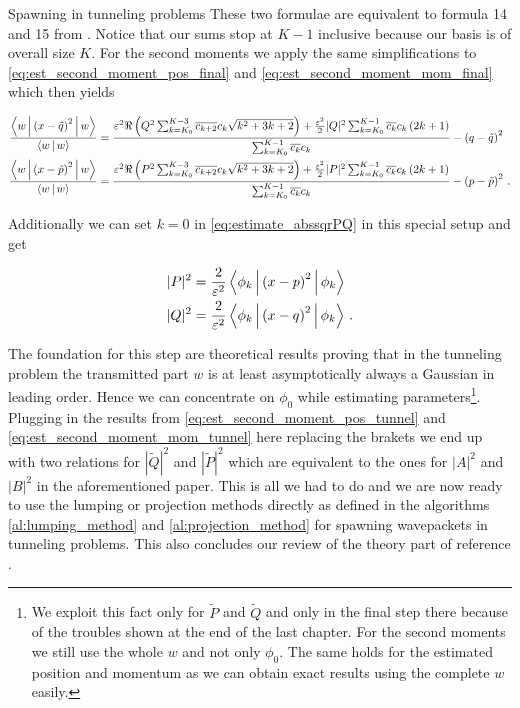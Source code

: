 \begin{chapter}{Spawning in tunneling problems}
These two formulae are equivalent to formula 14 and 15 from \cite{GHJ_tunneling_spawning}.
Notice that our sums stop at $K-1$ inclusive because our basis is of overall size $K$.
For the second moments we apply the same simplifications to \eqref{eq:est_second_moment_pos_final}
and \eqref{eq:est_second_moment_mom_final} which then yields

\begin{align} \label{eq:est_second_moment_pos_tunnel}
  \frac{\Braket{w|\left(x-\tilde{q}\right)^2|w}}{\Braket{w|w}} & =
  \frac{
    \varepsilon^2 \Re \left( Q^2 \sum_{k=K_0}^{K-3} \overline{c_{k+2}} c_{k} \sqrt{k^2+3k+2} \right) 
    + \frac{\varepsilon^2}{2} |Q|^2 \sum_{k=K_0}^{K-1} \overline{c_k} c_k \left(2k+1\right)
  }{\sum_{k=K_0}^{K-1} \overline{c_k} c_k}
  - \left(q - \tilde{q}\right)^2 \\
  \label{eq:est_second_moment_mom_tunnel}
  \frac{\Braket{w|\left(x-\tilde{p}\right)^2|w}}{\Braket{w|w}} & =
  \frac{
    \varepsilon^2 \Re \left( P^2 \sum_{k=K_0}^{K-3} \overline{c_{k+2}} c_{k} \sqrt{k^2+3k+2} \right) 
    + \frac{\varepsilon^2}{2} |P|^2 \sum_{k=K_0}^{K-1} \overline{c_k} c_k \left(2k+1\right)
  }{\sum_{k=K_0}^{K-1} \overline{c_k} c_k}
  - \left(p - \tilde{p}\right)^2 \,.
\end{align}

Additionally we can set $k=0$ in \eqref{eq:estimate_abssqrPQ} in this special setup
and get

\begin{equation}
\label{eq:estimate_abssqrPQ_tunnel}
\begin{split}
  |P|^2 & = \frac{2}{\varepsilon^2} \Braket{\phi_k | \left(x-p\right)^2 | \phi_k} \\
  |Q|^2 & = \frac{2}{\varepsilon^2} \Braket{\phi_k | \left(x-q\right)^2 | \phi_k} \,.
\end{split}
\end{equation}

The foundation for this step are theoretical results \cite{GHJ_exponentially_accurate}
proving that in the tunneling problem the transmitted part $w$ is at least
asymptotically always a Gaussian in leading order. Hence we can concentrate on
$\phi_0$ while estimating parameters\footnote{We exploit this fact only for $\tilde{P}$
and $\tilde{Q}$ and only in the final step there because of the troubles shown at the
end of the last chapter. For the second moments we still use the whole $w$ and
not only $\phi_0$. The same holds for the estimated position and momentum as we
can obtain exact results using the complete $w$ easily.}. 
Plugging in the results from \eqref{eq:est_second_moment_pos_tunnel} and
\eqref{eq:est_second_moment_mom_tunnel} here replacing the brakets we end up with
two relations for $|\tilde{Q}|^2$ and $|\tilde{P}|^2$ which are equivalent to the
ones for $|A|^2$ and $|B|^2$ in the aforementioned paper. This is all we had to do
and we are now ready to use the lumping or projection methods directly as defined
in the algorithms \ref{al:lumping_method} and \ref{al:projection_method} for
spawning wavepackets in tunneling problems. This also concludes our review of the
theory part of reference \cite{GHJ_tunneling_spawning}.



\end{chapter}
